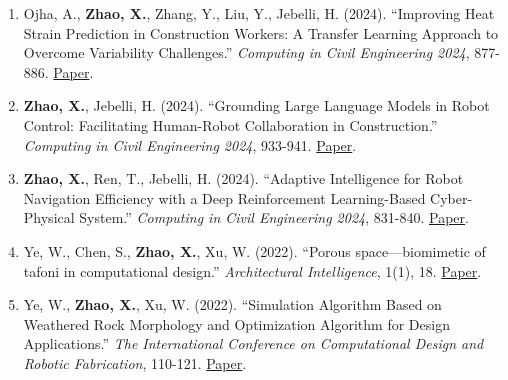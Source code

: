 \begin{enumerate}[leftmargin=1.5em, resume]
\item Ojha, A., \textbf{Zhao, X.}, Zhang, Y., Liu, Y., Jebelli, H. (2024). ``Improving Heat Strain Prediction in Construction Workers: A Transfer Learning Approach to Overcome Variability Challenges.'' \textit{Computing in Civil Engineering 2024}, 877-886. \href{https://ascelibrary.org/doi/abs/10.1061/9780784486139.094}{Paper}.
\item \textbf{Zhao, X.}, Jebelli, H. (2024). ``Grounding Large Language Models in Robot Control: Facilitating Human-Robot Collaboration in Construction.'' \textit{Computing in Civil Engineering 2024}, 933-941. \href{https://ascelibrary.org/doi/abs/10.1061/9780784486115.099}{Paper}.
\item \textbf{Zhao, X.}, Ren, T., Jebelli, H. (2024). ``Adaptive Intelligence for Robot Navigation Efficiency with a Deep Reinforcement Learning-Based Cyber-Physical System.'' \textit{Computing in Civil Engineering 2024}, 831-840. \href{https://ascelibrary.org/doi/abs/10.1061/9780784486115.088}{Paper}.
\item Ye, W., Chen, S., \textbf{Zhao, X.}, Xu, W. (2022). ``Porous space---biomimetic of tafoni in computational design.'' \textit{Architectural Intelligence}, 1(1), 18. \href{https://link.springer.com/article/10.1007/s44223-022-00019-4}{Paper}.
\item Ye, W., \textbf{Zhao, X.}, Xu, W. (2022). ``Simulation Algorithm Based on Weathered Rock Morphology and Optimization Algorithm for Design Applications.'' \textit{The International Conference on Computational Design and Robotic Fabrication}, 110-121. \href{https://link.springer.com/chapter/10.1007/978-981-19-8637-6_10}{Paper}.
\end{enumerate}

